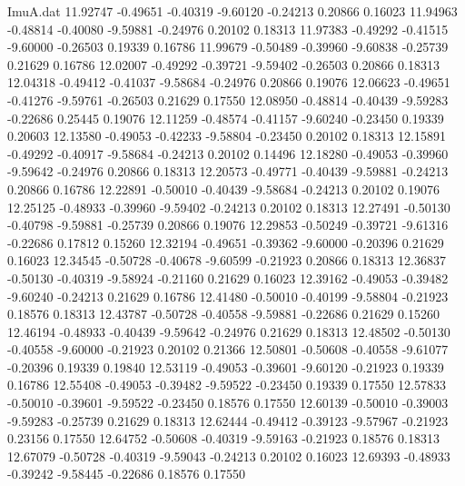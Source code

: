 \begin{filecontents}{ImuA.dat}
  11.92747   -0.49651   -0.40319   -9.60120   -0.24213    0.20866    0.16023
  11.94963   -0.48814   -0.40080   -9.59881   -0.24976    0.20102    0.18313
  11.97383   -0.49292   -0.41515   -9.60000   -0.26503    0.19339    0.16786
  11.99679   -0.50489   -0.39960   -9.60838   -0.25739    0.21629    0.16786
  12.02007   -0.49292   -0.39721   -9.59402   -0.26503    0.20866    0.18313
  12.04318   -0.49412   -0.41037   -9.58684   -0.24976    0.20866    0.19076
  12.06623   -0.49651   -0.41276   -9.59761   -0.26503    0.21629    0.17550
  12.08950   -0.48814   -0.40439   -9.59283   -0.22686    0.25445    0.19076
  12.11259   -0.48574   -0.41157   -9.60240   -0.23450    0.19339    0.20603
  12.13580   -0.49053   -0.42233   -9.58804   -0.23450    0.20102    0.18313
  12.15891   -0.49292   -0.40917   -9.58684   -0.24213    0.20102    0.14496
  12.18280   -0.49053   -0.39960   -9.59642   -0.24976    0.20866    0.18313
  12.20573   -0.49771   -0.40439   -9.59881   -0.24213    0.20866    0.16786
  12.22891   -0.50010   -0.40439   -9.58684   -0.24213    0.20102    0.19076
  12.25125   -0.48933   -0.39960   -9.59402   -0.24213    0.20102    0.18313
  12.27491   -0.50130   -0.40798   -9.59881   -0.25739    0.20866    0.19076
  12.29853   -0.50249   -0.39721   -9.61316   -0.22686    0.17812    0.15260
  12.32194   -0.49651   -0.39362   -9.60000   -0.20396    0.21629    0.16023
  12.34545   -0.50728   -0.40678   -9.60599   -0.21923    0.20866    0.18313
  12.36837   -0.50130   -0.40319   -9.58924   -0.21160    0.21629    0.16023
  12.39162   -0.49053   -0.39482   -9.60240   -0.24213    0.21629    0.16786
  12.41480   -0.50010   -0.40199   -9.58804   -0.21923    0.18576    0.18313
  12.43787   -0.50728   -0.40558   -9.59881   -0.22686    0.21629    0.15260
  12.46194   -0.48933   -0.40439   -9.59642   -0.24976    0.21629    0.18313
  12.48502   -0.50130   -0.40558   -9.60000   -0.21923    0.20102    0.21366
  12.50801   -0.50608   -0.40558   -9.61077   -0.20396    0.19339    0.19840
  12.53119   -0.49053   -0.39601   -9.60120   -0.21923    0.19339    0.16786
  12.55408   -0.49053   -0.39482   -9.59522   -0.23450    0.19339    0.17550
  12.57833   -0.50010   -0.39601   -9.59522   -0.23450    0.18576    0.17550
  12.60139   -0.50010   -0.39003   -9.59283   -0.25739    0.21629    0.18313
  12.62444   -0.49412   -0.39123   -9.57967   -0.21923    0.23156    0.17550
  12.64752   -0.50608   -0.40319   -9.59163   -0.21923    0.18576    0.18313
  12.67079   -0.50728   -0.40319   -9.59043   -0.24213    0.20102    0.16023
  12.69393   -0.48933   -0.39242   -9.58445   -0.22686    0.18576    0.17550

\end{filecontents}
